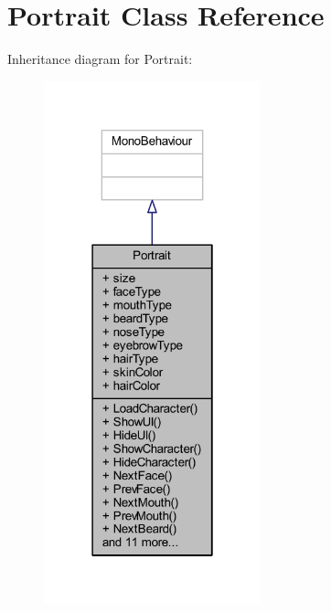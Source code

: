 \hypertarget{class_portrait}{}\section{Portrait Class Reference}
\label{class_portrait}


Inheritance diagram for Portrait\+:
\nopagebreak
\begin{figure}[H]
\begin{center}
\leavevmode
\includegraphics[width=178pt]{class_portrait__inherit__graph}
\end{center}
\end{figure}


